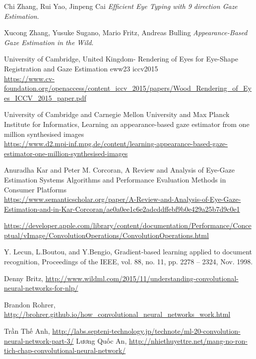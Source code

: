 \documentclass[12pt,a4paper,oneside]{book} %
\begin{document}
\begin{thebibliography}{99}

	Chi Zhang, Rui Yao, Jinpeng Cai
	\textit{Efﬁcient Eye Typing with 9 direction Gaze Estimation}.

	Xucong Zhang, Yusuke Sugano, Mario Fritz, Andreas Bulling
	\textit{Appearance-Based Gaze Estimation in the Wild}.


	University of Cambridge, United Kingdom- Rendering of Eyes for Eye-Shape Registration and Gaze Estimation eww23 iccv2015
	\\\url{https://www.cv-foundation.org/openaccess/content_iccv_2015/papers/Wood_Rendering_of_Eyes_ICCV_2015_paper.pdf}

	University of Cambridge and Carnegie Mellon University and Max Planck Institute for Informatics, Learning an appearance-based gaze estimator from one million synthesised images
	\\\url{https://www.d2.mpi-inf.mpg.de/content/learning-appearance-based-gaze-estimator-one-million-synthesised-images}

	Anuradha Kar and Peter M. Corcoran, A Review and Analysis of Eye-Gaze Estimation Systems Algorithms and Performance Evaluation Methods in Consumer Platforms
	\\\url{https://www.semanticscholar.org/paper/A-Review-and-Analysis-of-Eye-Gaze-Estimation-and-in-Kar-Corcoran/ae0a0ee1c6e2adcddffebf9b0e429a25b7d9c0e1}


	\url{https://developer.apple.com/library/content/documentation/Performance/Conceptual/vImage/ConvolutionOperations/ConvolutionOperations.html}

	Y. Lecun, L.Boutou, and Y.Bengio, Gradient-based learning applied to document recognition, Proceedings of the IEEE, vol. 88, no. 11, pp. 2278 – 2324, Nov. 1998.

	Denny Britz,
	\url{http://www.wildml.com/2015/11/understanding-convolutional-neural-networks-for-nlp/}

	Brandon Rohrer, \url{http://brohrer.github.io/how_convolutional_neural_networks_work.html}

	Trần Thế Anh,
	\url{http://labs.septeni-technology.jp/technote/ml-20-convolution-neural-network-part-3/}
	Lương Quốc An,
	\url{http://nhiethuyettre.net/mang-no-ron-tich-chap-convolutional-neural-network/}


\end{thebibliography}
\end{document}
